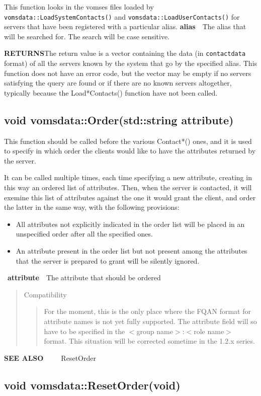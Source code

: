 \documentclass[a4paper]{book}
\newenvironment{compatibility}{\begin{quote}\color{red}Compatibility\begin{quote}}{\end{quote}\color{black}\end{quote}}
\newcommand{\also}[1]{\textbf{SEE ALSO}\newline\ \ \ \ \ #1}
\newcommand{\return}{\textbf{RETURNS}\newline}
\newcommand{\parameter}[2]{\newline\textbf{#1}\ \ #2}
\begin{document}
This function looks in the vomses files loaded by
\texttt{vomsdata::LoadSystemContacts()} and
\texttt{vomsdata::LoadUserContacts()} for servers that have been
registered with a particular alias.
\parameter{alias}{The alias that will be searched for.  The search will be case sensitive.}

\return The return value is a vector containing the data (in
\texttt{contactdata} format) of all the servers known by the system
that go by the specified alias.  This function does not have an error
code, but the vector may be empty if no servers satisfying the query
are found or if there are no known servers altogether, typically
because the Load*Contacts() function have not been called.

\bigskip\subsection{void vomsdata::Order(std::string attribute)}

This function should be called before the various Contact*() ones, and
it is used to specify in which order the clients would like to
have the attributes returned by the server.

It can be called multiple times, each time specifying a new attribute,
creating in this way an ordered list of attributes.  Then, when the
server is contacted, it will exemine this list of attributes against
the one it would grant the client, and order the latter in the same
way, with the following provisions:
\begin{itemize}
\item All attributes not explicitly indicated in the order list will
  be placed in an unspecified order after all the specified ones.
\item An attribute present in the order list but not present among the
  attributes that the server is prepared to grant will be silently
  ignored.
\end{itemize}
\ \parameter{attribute}{The attribute that should be ordered}

\begin{compatibility}
For the moment, this is the only place where the FQAN format for
attribute names is not yet fully supported. The attribute field will
so have to be specified in the $<$group name$>$:$<$role name$>$
format.  This situation will be corrected sometime in the 1.2.x
series.
\end{compatibility}
\also{ResetOrder}

\subsection{void vomsdata::ResetOrder(void)}
\end{document}
